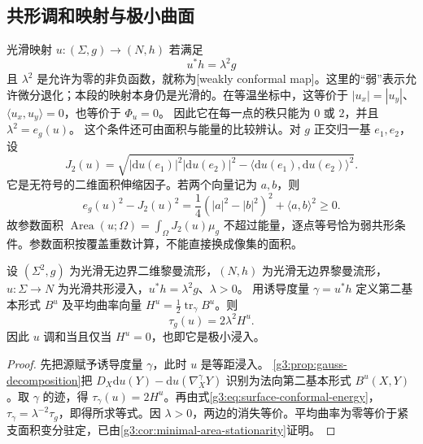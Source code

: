 \subsection{共形调和映射与极小曲面}
\label{g3:subsec:1804:03}
光滑映射 \(u:(\Sigma,g)\to(N,h)\) 若满足
\[
	u^*h=\lambda^2g
\]
且 \(\lambda^2\) 是允许为零的非负函数，就称为[weakly conformal map]。这里的“弱”表示允许微分退化；本段的映射本身仍是光滑的。在等温坐标中，这等价于
\(|u_x|=|u_y|\)、\(\langle u_x,u_y\rangle=0\)，也等价于 \(\Phi_u=0\)。
因此它在每一点的秩只能为 \(0\) 或 \(2\)，并且 \(\lambda^2=e_g(u)\)。
\ProseParagraphBreak
这个条件还可由面积与能量的比较辨认。对 \(g\) 正交归一基 \(e_1,e_2\)，设
\[
	J_2(u)=\sqrt{|\mathrm du(e_1)|^2|\mathrm du(e_2)|^2
	-\langle\mathrm du(e_1),\mathrm du(e_2)\rangle^2}.
\]
它是无符号的二维面积伸缩因子。若两个向量记为 \(a,b\)，则
\[
	e_g(u)^2-J_2(u)^2
	=\frac14(|a|^2-|b|^2)^2+\langle a,b\rangle^2\ge0.
\]
故参数面积 \(\operatorname{Area}(u;\Omega)=\int_\Omega J_2(u)\mu_g\) 不超过能量，逐点等号恰为弱共形条件。参数面积按覆盖重数计算，不能直接换成像集的面积。

\begin{proposition}\label{g3:prop:conformal-harmonic-minimal}
	设 \((\Sigma^2,g)\) 为光滑无边界二维黎曼流形，\((N,h)\) 为光滑无边界黎曼流形，
	\(u:\Sigma\to N\) 为光滑共形浸入，\(u^*h=\lambda^2g\)、\(\lambda>0\)。
	用诱导度量 \(\gamma=u^*h\) 定义第二基本形式 \(B^u\) 及平均曲率向量
	\(H^u=\frac12\operatorname{tr}_\gamma B^u\)。则
	\begin{equation}\label{g3:eq:conformal-tension-mean-curvature}
		\tau_g(u)=2\lambda^2H^u.
	\end{equation}
	因此 \(u\) 调和当且仅当 \(H^u=0\)，也即它是极小浸入。
\end{proposition}
\begin{proof}
	先把源赋予诱导度量 \(\gamma\)，此时 \(u\) 是等距浸入。
	\cref{g3:prop:gauss-decomposition}把
	\(D_X\mathrm du(Y)-\mathrm du(\nabla^\gamma_XY)\)
	识别为法向第二基本形式 \(B^u(X,Y)\)。取 \(\gamma\) 的迹，得
	\(\tau_\gamma(u)=2H^u\)。再由式\eqref{g3:eq:surface-conformal-energy}，
	\(\tau_\gamma=\lambda^{-2}\tau_g\)，即得所求等式。因 \(\lambda>0\)，两边的消失等价。平均曲率为零等价于紧支面积变分驻定，已由\cref{g3:cor:minimal-area-stationarity}证明。
\end{proof}

